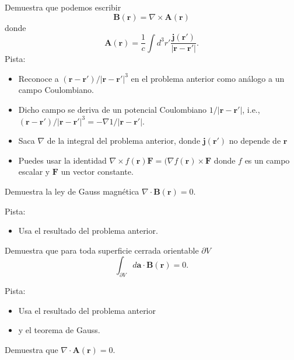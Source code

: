 \documentclass{exam}
\begin{document}
\begin{questions}
  \question Demuestra que podemos escribir
    $$ \bm B(\bm r)=\nabla\times \bm A(\bm r)$$
    donde
    $$ \bm A(\bm r)=\frac{1}{c}\int d^3r' \frac{\bm j(\bm r')}{|\bm
      r-\bm r'|}.
    $$
    Pista:
    \begin{itemize}
    \item Reconoce a $(\bm r-\bm r')/|\bm r-\bm r'|^3$ en el problema
      anterior como análogo a un campo Coulombiano.
    \item Dicho campo se deriva de un potencial Coulombiano $1/|\bm
      r-\bm r'|$, i.e.,
      $(\bm r-\bm r')/|\bm r-\bm r'|^3=-\nabla 1/|\bm r-\bm r'|$.
    \item Saca $\nabla$ de la integral del problema anterior, donde
      $\bm j(\bm r')$ no depende de $\bm r$
    \item Puedes usar la identidad $\nabla \times f(\bm r) \bm
      F=(\nabla f(\bm r)\times \bm F$ donde $f$ es un campo escalar y
      $\bm F$ un vector constante.
    \end{itemize}
  \question Demuestra la ley de Gauss magnética $\nabla\cdot \bm B(\bm r)=0$.

    Pista:
    \begin{itemize}
    \item Usa el resultado del problema anterior.
    \end{itemize}

  \question Demuestra que para toda superficie cerrada orientable
    $\partial V$
    $$\int_{\partial V}d\bm a\cdot\bm B(\bm r)=0.$$

    Pista:
    \begin{itemize}
    \item Usa el resultado del problema anterior
    \item y el teorema de Gauss.
    \end{itemize}
  \question Demuestra que $\nabla\cdot\bm A(\bm r)=0$.


\end{questions}
\end{document}
